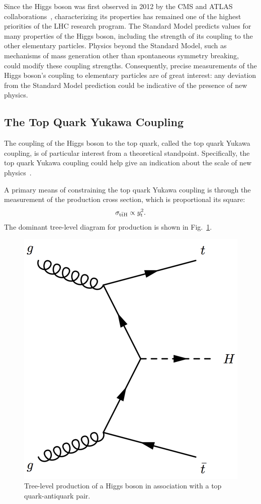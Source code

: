 Since the Higgs boson was first observed in 2012 by the CMS and ATLAS collaborations~\cite{Aad:2012tfa, Chatrchyan:2012xdj, Chatrchyan:2013lba}, characterizing its properties has remained one of the highest priorities of the LHC research program. 
The Standard Model predicts values for many properties of the Higgs boson, including the strength of its coupling to the other elementary particles.
Physics beyond the Standard Model, such as mechanisms of mass generation other than spontaneous symmetry breaking, could modify these coupling strengths. 
Consequently, precise measurements of the Higgs boson's coupling to elementary particles are of great interest: any deviation from the Standard Model prediction could be indicative of the presence of new physics.
%
\subsection{The Top Quark Yukawa Coupling}
The coupling of the Higgs boson to the top quark, called the top quark Yukawa coupling, is of particular interest from a theoretical standpoint.
Specifically, the top quark Yukawa coupling could help give an indication about the scale of new physics~\cite{why_care_top_yukawa}.

A primary means of constraining the top quark Yukawa coupling is through the measurement of the \ttH production cross section, which is proportional its square:
\begin{equation}
\sigma_{\mathrm{t\bar{t}H}} \propto y_{\text{t}}^2.
\end{equation}
The dominant tree-level diagram for \ttH production is shown in Fig.~\ref{fig:tth_feynman}.
\begin{figure} [htbp!]
    \centering
    \includegraphics[width=0.4\linewidth]{figures/tth/tth_feynman.png}
    \caption{Tree-level production of a Higgs boson in association with a top quark-antiquark pair.}
    \label{fig:tth_feynman}
\end{figure} 

